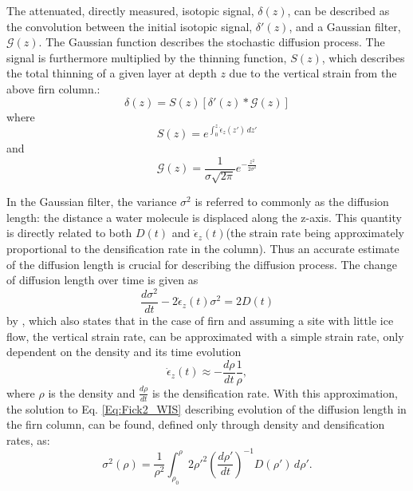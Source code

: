 \documentclass[../../CompleteThesis2/Complete_2ndDraft]{subfiles}
\begin{document}
The attenuated, directly measured, isotopic signal, $\delta(z)$, can be described as the convolution between the initial isotopic signal, $\delta '(z)$, and a Gaussian filter, $\mathcal{G}(z)$. The Gaussian function describes the stochastic diffusion process. The signal is furthermore multiplied by the thinning function, $S(z)$, which describes the total thinning of a given layer at depth $z$ due to the vertical strain from the above firn column.:
\begin{equation}
	\delta(z) = S(z)[\delta'(z)*\mathcal{G}(z)]
	\label{Eq:diff_solution_conv}
\end{equation}
where
\begin{equation}
	S(z) = e^{\int_{0}^{z}\dot{\epsilon}_z(z')\, dz'}
	\label{Eq:Thinning_fct}
\end{equation}
and
\begin{equation}
	\mathcal{G}(z) = \frac{1}{\sigma\sqrt{2\pi}}e^{-\frac{z^2}{2\sigma^2}}
	\label{Eq:Gauss_filter}
\end{equation}

In the Gaussian filter, the variance $\sigma^2$ is referred to commonly as the diffusion length: the distance a water molecule is displaced along the z-axis. This quantity is directly related to both $D(t)$ and $\dot{\epsilon}_z(t)$(the strain rate being approximately proportional to the densification rate in the column). Thus an accurate estimate of the diffusion length is crucial for describing the diffusion process.
The change of diffusion length over time is given as 
\begin{equation}
	\frac{d\sigma^2}{dt} - 2\dot{\epsilon}_z (t)\sigma^2 = 2 D(t)
	\label{Eq:Evolution_DiffLen}
\end{equation}
by \cite[Johnsen, 1977]{Johnsen1977}, which also states that in the case of firn and assuming a site with little ice flow, the vertical strain rate, can be approximated with a simple strain rate, only dependent on the density and its time evolution
\begin{equation}
	\dot{\epsilon}_z(t) \approx - \frac{d\rho}{dt}\frac{1}{\rho}
	\label{Eq:strain_rate_approx},
\end{equation}
where $\rho$ is the density and $\frac{d\rho}{dt}$ is the densification rate. With this approximation, the solution to Eq. \ref{Eq:Fick2_WIS} describing evolution of the diffusion length in the firn column, can be found, defined only through density and densification rates, as:
\begin{equation}
	\sigma^2(\rho) =\frac{1}{\rho^2} \int_{\rho_0}^{\rho}2\rho'^2\left(\frac{d\rho'}{dt}\right)^{-1} D(\rho') \, d\rho'.
	\label{Eq:Diff_Len_Firn}
\end{equation}
\end{document}
